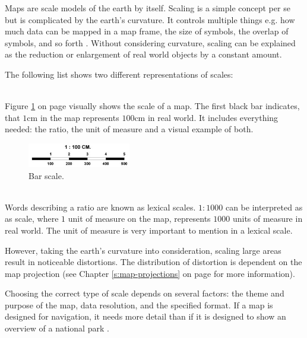 Maps are scale models of the earth by itself. Scaling is a simple concept per se but is complicated by the earth's curvature. It controls multiple things e.g. how much data can be mapped in a map frame, the size of symbols, the overlap of symbols, and so forth . Without considering curvature, scaling can be explained as the reduction or enlargement of real world objects by a constant amount.

The following list shows two different representations of scales:
\begin{enumerate}
 \hfill \\
Figure \ref{fig:bar-scale} on page \pageref{fig:bar-scale} visually shows the scale of a map. The first black bar indicates, that $1$cm in the map represents $100$cm in real world. It includes everything needed: the ratio, the unit of measure and a visual example of both.

\begin{figure}[!htb]
\centering
\includegraphics[width=0.4\textwidth,keepaspectratio]{images/methods/scalebar.jpg}
\caption[
    Bar scale.
]{Bar scale.}
\label{fig:bar-scale}
\end{figure}

 \hfill \\
Words describing a ratio are known as lexical scales. $1:1000$ can be interpreted as as scale, where $1$ unit of measure on the map, represents $1000$ units of measure in real world. The unit of measure is very important to mention in a lexical scale.
\end{enumerate}

However, taking the earth's curvature into consideration, scaling large areas result in noticeable distortions. The distribution of distortion is dependent on the map projection (see Chapter \ref{s:map-projections} on page \pageref{s:map-projections} for more information).

Choosing the correct type of scale depends on several factors: the theme and purpose of the map, data resolution, and the specified format. If a map is designed for navigation, it needs more detail than if it is designed to show an overview of a national park .